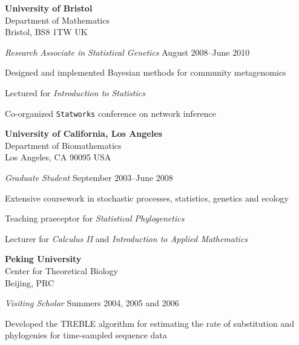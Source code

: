 \documentclass[10pt]{article}
\newenvironment{outerlist}[1][\enskip\textbullet]%
        {\begin{itemize}[#1]}{\end{itemize}%
         \vspace{-.6\baselineskip}}
\newenvironment{innerlist}[1][\enskip\textbullet]%
        {\begin{compactitem}[#1]}{\end{compactitem}}
\newcommand{\blankline}{\quad\pagebreak[2]}
\begin{document}
\textbf{University of Bristol} \\
Department of Mathematics \\
Bristol, BS8 1TW UK

\begin{outerlist}
\item[] \textit{Research Associate in Statistical Genetics}%
        \hfill {August 2008--June 2010}

\begin{innerlist}
\item Designed and implemented Bayesian methods for community metagenomics
\item Lectured for \emph{Introduction to Statistics}
\item Co-organized \verb+Statworks+ conference on network inference
\end{innerlist}

\end{outerlist}
\blankline

\textbf{University of California, Los Angeles} \\
Department of Biomathematics \\
Los Angeles, CA 90095 USA

\begin{outerlist}
\item[] \textit{Graduate Student}%
        \hfill {September 2003--June 2008}
\begin{innerlist}
\item Extensive coursework in stochastic processes, statistics, genetics and ecology
\item Teaching praeceptor for \emph{Statistical Phylogenetics}
\item Lecturer for \emph{Calculus II} and \emph{Introduction to Applied Mathematics}
\end{innerlist}
\end{outerlist}

\blankline

\textbf{Peking University} \\
Center for Theoretical Biology \\
Beijing, PRC

\begin{outerlist}
\item[] \textit{Visiting Scholar}%
        \hfill {Summers 2004, 2005 and 2006}
\begin{innerlist}
\item Developed the TREBLE algorithm for estimating the rate of substitution and phylogenies for time-sampled sequence data
\end{innerlist}
\end{outerlist}
\end{document}
